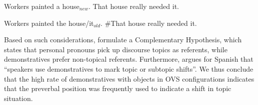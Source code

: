 \documentclass[output=paper,modfonts,nonflat]{langsci/langscibook}
\begin{document}
\ea
Workers painted a house$_{new}$. That house really needed it.\label{dem4}
\z

\ea
Workers painted the house/it$_{old}$. \#That house really needed it.\label{dem5}
\z


Based on such considerations, \citet{BoschEtAl:2003} formulate a Complementary Hypothesis, which states that personal pronouns pick up discourse topics as referents, while demonstratives prefer non-topical referents. Furthermore, \citet[175]{Zulaica:2011} argues for Spanish that ``speakers use demonstratives to mark topic or subtopic shifts''. We thus conclude that the high rate of demonstratives with objects in OVS configurations indicates that the preverbal position was frequently used to indicate a shift in topic situation. %
	


\end{document}
